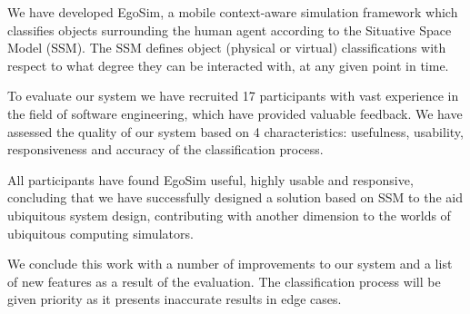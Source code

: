 We have developed EgoSim, a mobile context-aware simulation framework which classifies objects surrounding the human agent according to the Situative Space Model (SSM). The SSM defines object (physical or virtual) classifications with respect to what degree they can be interacted with, at any given point in time.


To evaluate our system we have recruited 17 participants with vast experience in the field of software engineering, which have provided valuable feedback. We have assessed the quality of our system based on 4 characteristics: usefulness, usability, responsiveness and accuracy of the classification process.


All participants have found EgoSim useful, highly usable and responsive, concluding that we have successfully designed a solution based on SSM to the aid ubiquitous system design, contributing with another dimension to the worlds of ubiquitous computing simulators.





We conclude this work with a number of improvements to our system and a list of new features as a result of the evaluation. The classification process will be given priority as it presents inaccurate results in edge cases.

\endgroup			

\vfill